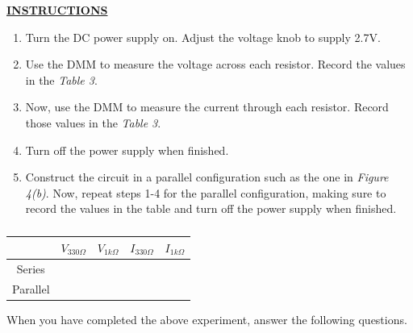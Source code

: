 \documentclass[12pt]{article}
\begin{document}
\textbf{\underline{INSTRUCTIONS}}

\begin{enumerate}
    \item Turn the DC power supply on. Adjust the voltage knob to supply 2.7V. 
    \item Use the DMM to measure the voltage across each resistor. Record the values in the \textit{Table 3}.
    \item Now, use the DMM to measure the current through each resistor. Record those values in the \textit{Table 3}.
    \item Turn off the power supply when finished.
    \item Construct the circuit in a parallel configuration such as the one in \textit{Figure 4(b)}. Now, repeat steps 1-4 for the parallel configuration, making sure to record the values in the table and turn off the power supply when finished.
\end{enumerate}

\begin{table}[H]
    \centering
    \begin{tabular}{|c||l|l|l|l|}
        \hline
            & \hspace{0.5cm} $V_{330\Omega}$ \hspace{0.5cm}    & \hspace{0.5cm}  $V_{1k\Omega}$ \hspace{0.5cm}  &   \hspace{0.5cm} $I_{330\Omega}$  \hspace{0.5cm}   & \hspace{0.5cm} $I_{1k\Omega}$  \hspace{0.5cm}   \\ \hline \hline
           Series &                  &                  &              &          \\ \hline
           Parallel &                  &                  &             &           \\ \hline
    \end{tabular}
    \caption{}
\end{table}

When you have completed the above experiment, answer the following questions.
\end{document}
